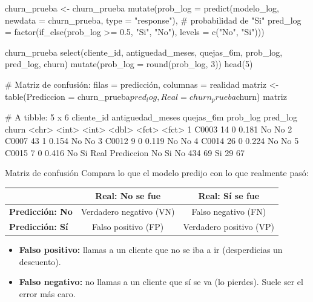 \begin{rcode}
churn_prueba <- churn_prueba %
  mutate(prob_log = predict(modelo_log, newdata = churn_prueba,
                            type = "response"),   # probabilidad de "Si"
         pred_log = factor(if_else(prob_log >= 0.5, "Si", "No"),
                           levels = c("No", "Si")))

churn_prueba %
  select(cliente_id, antiguedad_meses, quejas_6m, prob_log, pred_log,
         churn) %
  mutate(prob_log = round(prob_log, 3)) %
  head(5)

# Matriz de confusión: filas = predicción, columnas = realidad
matriz <- table(Prediccion = churn_prueba$pred_log,
                Real = churn_prueba$churn)
matriz
\end{rcode}

\begin{rsalida}
# A tibble: 5 x 6
  cliente_id antiguedad_meses quejas_6m prob_log pred_log churn
  <chr>                 <int>     <int>    <dbl> <fct>    <fct>
1 C0003                    14         0    0.181 No       No   
2 C0007                    43         1    0.154 No       No   
3 C0012                     9         0    0.119 No       No   
4 C0014                    26         0    0.224 No       No   
5 C0015                     7         0    0.416 No       Si   
          Real
Prediccion  No  Si
        No 434  69
        Si  29  67
\end{rsalida}

\begin{concepto}{Matriz de confusión}
Compara lo que el modelo predijo con lo que realmente pasó:

\begin{center}
\small
\begin{tabular}{lcc}
\toprule
 & \textbf{Real: No se fue} & \textbf{Real: Sí se fue} \\
\midrule
\textbf{Predicción: No} & Verdadero negativo (VN) & Falso negativo (FN) \\
\textbf{Predicción: Sí} & Falso positivo (FP) & Verdadero positivo (VP) \\
\bottomrule
\end{tabular}
\end{center}

\begin{itemize}
  \item \textbf{Falso positivo:} llamas a un cliente que no se iba a ir
        (desperdicias un descuento).
  \item \textbf{Falso negativo:} no llamas a un cliente que sí se va (lo
        pierdes). Suele ser el error más caro.
\end{itemize}
\end{concepto}


